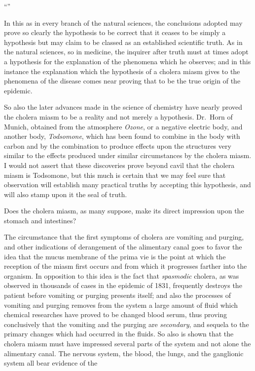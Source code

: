 ``''

In this as in every branch of the natural sciences, the conclusions
adopted may prove so clearly the hypothesis to be correct that it ceases
to be simply a hypothesis but may claim to be classed as an established
scientific truth. As in the natural sciences, so in medicine, the inquirer
after truth must at times adopt a hypothesis for the explanation of the
phenomena which he observes; and in this instance the explanation
which the hypothesis of a cholera miasm gives to the phenomena of
the disease comes near proving that to be the true origin of the
epidemic.

So also the later advances made in the science of chemistry have
nearly proved the cholera miasm to be a reality and not merely a
hypothesis. Dr.\ Horn of Munich, obtained from the atmosphere
\emph{Ozone}, or a negative electric body, and another body, \emph{Todsomone},
which has been found to combine in the body with carbon and by the
combination to produce effects upon the structures very similar to the
effects produced under similar circumstances by the cholera miasm. I
would not assert that these discoveries prove beyond cavil that the
cholera miasm is Todsomone, but this much is certain that we may feel
sure that observation will establish many practical truths by accepting
this hypothesis, and will also stamp upon it the seal of truth.

\vspace{\baselineskip}

Does the cholera miasm, as many suppose, make its direct impression
upon the stomach and intestines?

The circumstance that the first symptoms of cholera are vomiting and
purging, and other indications of derangement of the alimentary canal
goes to favor the idea that the mucus membrane of the prima vie is the
point at which the reception of the miasm first occurs and from which
it progresses farther into the organism. In opposition to this idea is
the fact that \emph{spasmodic} cholera, as was observed in thousands of cases
in the epidemic of 1831, frequently destroys the patient before vomiting
or purging presents itself; and also the processes of vomiting and
purging removes from the system a large amount of fluid which chemical
researches have proved to be changed blood serum, thus proving
conclusively that the vomiting and the purging are \emph{secondary}, and
sequela to the primary changes which had occurred in the fluids. So
also is shown that the cholera miasm must have impressed several parts
of the system and not alone the alimentary canal. The nervous system,
the blood, the lungs, and the ganglionic system all bear evidence of the\endinput